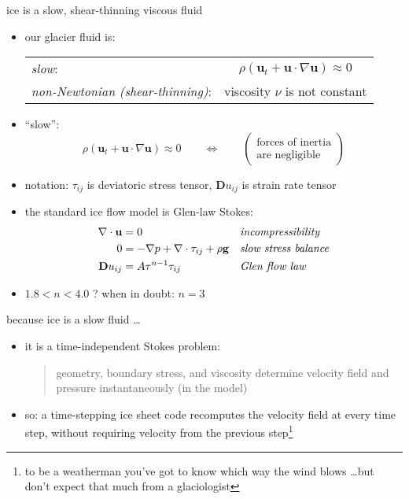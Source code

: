 \documentclass{beamer}
\begin{document}
\begin{frame}{ice is a slow, shear-thinning viscous fluid}

\begin{itemize}
\item our glacier fluid is:
\smallskip

  \begin{tabular}{lc}
  \emph{slow}: & $\rho \left(\mathbf{u}_t + \mathbf{u}\cdot\nabla \mathbf{u}\right) \approx 0$ \\
  \emph{non-Newtonian (shear-thinning)}: & viscosity $\nu$ is not constant
  \end{tabular}
\item ``slow'':
  $$\rho \left(\mathbf{u}_t + \mathbf{u}\cdot\nabla \mathbf{u}\right) \approx 0 \qquad \iff \qquad \begin{pmatrix} \text{forces of inertia} \\ \text{are negligible} \end{pmatrix}$$
\item notation: $\tau_{ij}$ is deviatoric stress tensor, $\mathbf{D}u_{ij}$ is strain rate tensor
\item the standard ice flow model is Glen-law Stokes:
\begin{align*}
\nabla \cdot \mathbf{u} &= 0 &&\text{\emph{incompressibility}} \\
0 &= - \nabla p + \nabla \cdot \tau_{ij} + \rho \mathbf{g} &&\text{\emph{slow stress balance}} \\
\mathbf{D}u_{ij} &= A \tau^{n-1} \tau_{ij} &&\text{\emph{Glen flow law}}
\end{align*}
\item $1.8 < n < 4.0$ ?  \quad when in doubt: $n=3$
\end{itemize}
\end{frame}


\begin{frame}{because ice is a slow fluid \dots}

\begin{itemize}
\item it is a time-independent Stokes problem:
  \begin{quote}
  \alert{geometry, boundary stress, and viscosity determine velocity field and pressure instantaneously} (in the model)
  \end{quote}
\item so: a time-stepping ice sheet code recomputes the velocity field at every time step, without requiring velocity from the previous step\footnote{to be a weatherman you've got to know which way the wind blows \dots but don't expect that much from a glaciologist}
\end{itemize}
\end{frame}
\end{document}
